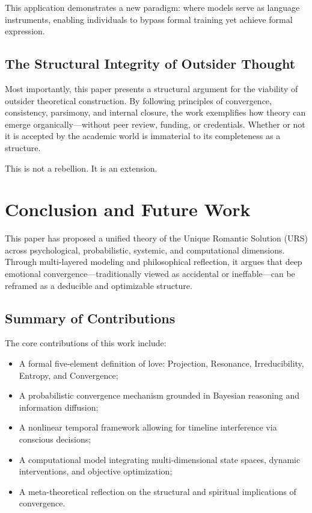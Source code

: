 \documentclass[12pt]{article}
\begin{document}
This application demonstrates a new paradigm: where models serve as language instruments, enabling individuals to bypass formal training yet achieve formal expression.

\subsection{The Structural Integrity of Outsider Thought}

Most importantly, this paper presents a structural argument for the viability of outsider theoretical construction. By following principles of convergence, consistency, parsimony, and internal closure, the work exemplifies how theory can emerge organically—without peer review, funding, or credentials. Whether or not it is accepted by the academic world is immaterial to its completeness as a structure.

This is not a rebellion. It is an extension.

\section{Conclusion and Future Work}

This paper has proposed a unified theory of the Unique Romantic Solution (URS) across psychological, probabilistic, systemic, and computational dimensions. Through multi-layered modeling and philosophical reflection, it argues that deep emotional convergence—traditionally viewed as accidental or ineffable—can be reframed as a deducible and optimizable structure.

\subsection{Summary of Contributions}

The core contributions of this work include:

\begin{itemize}
  \item A formal five-element definition of love: Projection, Resonance, Irreducibility, Entropy, and Convergence;
  \item A probabilistic convergence mechanism grounded in Bayesian reasoning and information diffusion;
  \item A nonlinear temporal framework allowing for timeline interference via conscious decisions;
  \item A computational model integrating multi-dimensional state spaces, dynamic interventions, and objective optimization;
  \item A meta-theoretical reflection on the structural and spiritual implications of convergence.
\end{itemize}
\end{document}
